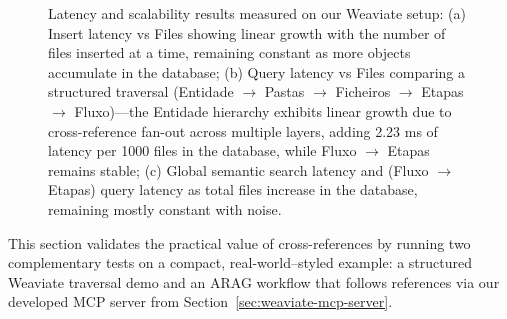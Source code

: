 \begin{figure}[htbp]
    \centering
    \hfill
    \hfill
    \caption{Latency and scalability results measured on our Weaviate setup: (a) Insert latency vs Files showing linear growth with the number of files inserted at a time, remaining constant as more objects accumulate in the database; (b) Query latency vs Files comparing a structured traversal (Entidade $\rightarrow$ Pastas $\rightarrow$ Ficheiros $\rightarrow$ Etapas $\rightarrow$ Fluxo)—the Entidade hierarchy exhibits linear growth due to cross-reference fan-out across multiple layers, adding 2.23 ms of latency per 1000 files in the database, while Fluxo $\rightarrow$ Etapas remains stable; (c) Global semantic search latency and (Fluxo $\rightarrow$ Etapas) query latency as total files increase in the database, remaining mostly constant with noise.}
\end{figure}

This section validates the practical value of cross-references by running two complementary tests on a compact, real-world–styled example: a structured Weaviate traversal demo and an \gls{ARAG} workflow that follows references via our developed \gls{MCP} server from Section~\ref{sec:weaviate-mcp-server}. 

